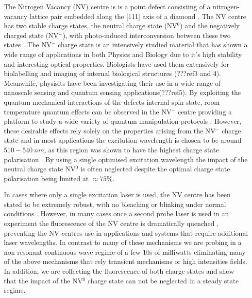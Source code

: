 \documentclass[prl]{revtex4}
\begin{document}
The Nitrogen Vacancy (NV) centre is is a point defect consisting of a nitrogen-vacancy lattice pair embedded along the [111] axis of a diamond \cite{davies_optical_1976}. The NV centre has two stable charge states, the neutral charge state (NV$^0$) and the negatively charged state (NV$^-$), with photo-induced interconversion between these two states \cite{siyushev_optically_2013}. The NV$^-$ charge state is an intensively studied material that has shown a wide range of applications in both Physics and Biology due to it's high stability and interesting optical properties. Biologists have used them extensively for biolabelling and imaging of internal biological structures (???ref3 and 4). Meanwhile, physisits have been investigating their use in a wide range of nanoscale sensing and quantum sensing applications(???ref5). By exploiting the quantum mechanical interactions of the defects internal spin state, room temperature quantum effects can be observed in the NV$^-$ centre providing a platform to study a wide variety of quantum manipulation protocols \cite{jelezko_single_2006}. However, these desirable effects rely solely on the properties arising from the NV$^-$ charge state and in most applications the excitation wavelength is chosen to be around $510-\SI{540}{nm}$, as this region was shown to have the highest charge state polarisation \cite{aslam_photo-induced_2013}. By using a single optimised excitation wavelength the impact of the neutral charge state NV$^0$ is often neglected despite the optimal charge state polarisation being limited at $\approx75\%$. %

In cases where only a single excitation laser is used, the NV centre has been stated to be extremely robust, with no bleaching or blinking under normal conditions \cite{schirhagl_nitrogen-vacancy_2014}. However, in many cases once a second probe laser is used in an experiment the fluorescence of the NV centre is dramatically quenched \cite{chapman_anomalous_2012,noauthor_nitrogen-vacancy_nodate,lai_quenching_2013,geiselmann_fast_2013,noauthor_stimulated_nodate}, preventing the NV centres use in applications and systems that require additional laser wavelengths. In contrast to many of these mechanisms we are probing in a non resonant continuous-wave regime of a few 10s of milliwatts eliminating many of the above mechanisms that rely transient mechanisms or high intensities fields. In addition, we are collecting the fluorescence of both charge states and show that the impact of the NV$^0$ charge state can not be neglected in a steady state regime. %
\end{document}
